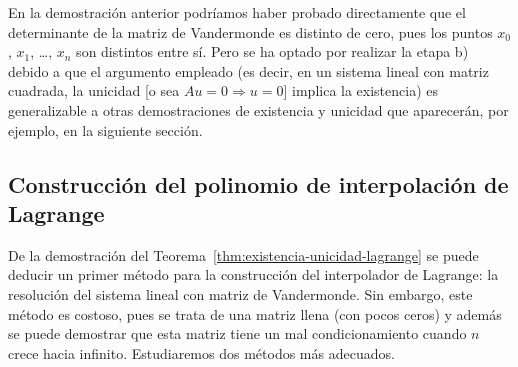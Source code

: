  \begin{remark}
   \label{rk:1}
   En la demostración anterior podríamos haber probado directamente
   que el determinante de la matriz de Vandermonde es distinto de cero,
   pues los puntos $x_0$, $x_1$, \dots, $x_n$ son distintos
   entre sí. Pero se ha optado por realizar la etapa b) debido a que el
   argumento empleado (es decir, en un sistema lineal con matriz
   cuadrada, la unicidad [o sea $Au=0 \Rightarrow u=0$] implica la existencia)
   es generalizable a otras demostraciones de existencia y unicidad que
   aparecerán, por ejemplo, en la siguiente sección.
 \end{remark}

 \subsection{Construcción del polinomio de interpolación de Lagrange}
 \label{sec:construcion--polinomio-lagrange}

 De la demostración del Teorema~\ref{thm:existencia-unicidad-lagrange}
 se puede deducir un primer método para la construcción del
 interpolador de Lagrange: la resolución del sistema lineal con matriz
 de Vandermonde. Sin embargo, este método es costoso, pues se trata de
 una matriz llena (con pocos ceros) y además se puede demostrar que
 esta matriz tiene un mal condicionamiento cuando $n$ crece hacia
 infinito. Estudiaremos dos métodos más adecuados.

